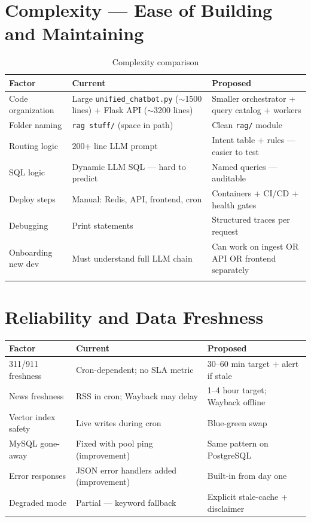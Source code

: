 \documentclass[11pt,a4paper]{article}
\begin{document}
\section{Complexity --- Ease of Building and Maintaining}

\begin{longtable}{@{}p{3.2cm}p{5.3cm}p{5.3cm}@{}}
\toprule
\textbf{Factor} & \textbf{Current} & \textbf{Proposed} \\
\midrule
\endhead
Code organization & Large \texttt{unified\_chatbot.py} ($\sim$1500 lines) + Flask API ($\sim$3200 lines) & Smaller orchestrator + query catalog + workers \\
Folder naming & \texttt{rag stuff/} (space in path) & Clean \texttt{rag/} module \\
Routing logic & 200+ line LLM prompt & Intent table + rules --- easier to test \\
SQL logic & Dynamic LLM SQL --- hard to predict & Named queries --- auditable \\
Deploy steps & Manual: Redis, API, frontend, cron & Containers + CI/CD + health gates \\
Debugging & Print statements & Structured traces per request \\
Onboarding new dev & Must understand full LLM chain & Can work on ingest OR API OR frontend separately \\
\bottomrule
\caption{Complexity comparison}
\end{longtable}

\section{Reliability and Data Freshness}

\begin{longtable}{@{}p{3.2cm}p{5.3cm}p{5.3cm}@{}}
\toprule
\textbf{Factor} & \textbf{Current} & \textbf{Proposed} \\
\midrule
\endhead
311/911 freshness & Cron-dependent; no SLA metric & 30--60 min target + alert if stale \\
News freshness & RSS in cron; Wayback may delay & 1--4 hour target; Wayback offline \\
Vector index safety & Live writes during cron & Blue-green swap \\
MySQL gone-away & Fixed with pool ping (improvement) & Same pattern on PostgreSQL \\
Error responses & JSON error handlers added (improvement) & Built-in from day one \\
Degraded mode & Partial --- keyword fallback & Explicit stale-cache + disclaimer \\
\bottomrule
\end{longtable}
\end{document}
